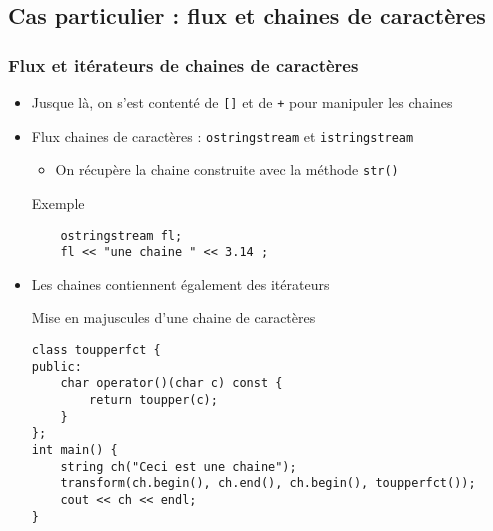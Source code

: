 \subsection{Cas particulier : flux et chaines de caractères}

\begin{frame}[fragile]
\frametitle{Flux et itérateurs de chaines de caractères}
\begin{itemize}
\item Jusque là, on s'est contenté de \verb|[]| et de \verb|+| pour manipuler les chaines
\item Flux chaines de caractères : \verb|ostringstream| et \verb|istringstream|
\begin{itemize}
\item On récupère la chaine construite avec la méthode \verb|str()|
\end{itemize}
\begin{codeblock}{Exemple}
\begin{lstlisting}
    ostringstream fl;
    fl << "une chaine " << 3.14 ;
\end{lstlisting}
\end{codeblock}
\item Les chaines contiennent également des itérateurs
\begin{codeblock}{Mise en majuscules d'une chaine de caractères}
\begin{lstlisting}
class toupperfct {
public:
    char operator()(char c) const {
        return toupper(c);
    }
};
int main() {
    string ch("Ceci est une chaine");
    transform(ch.begin(), ch.end(), ch.begin(), toupperfct());
    cout << ch << endl;
}
\end{lstlisting}
\end{codeblock}
\end{itemize}
\end{frame}
